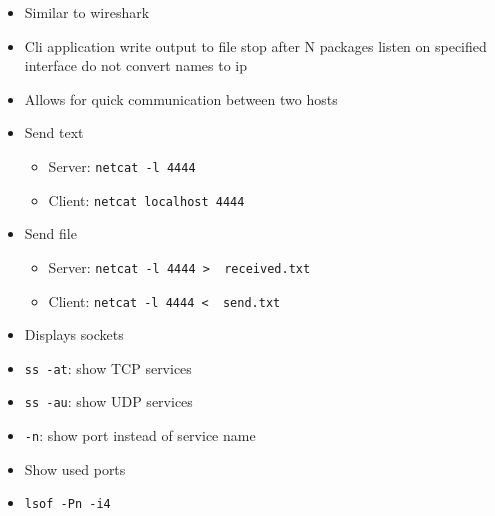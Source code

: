 \begin{itemize}
\begin{itemize}
            \item Similar to wireshark
            \item Cli application
             write output to file
             stop after N packages
             listen on specified interface
             do not convert names to ip
        \end{itemize}
        \begin{itemize}
            \item Allows for quick communication between two hosts
            \item Send text
                \begin{itemize}
                    \item Server: \verb+netcat -l 4444+
                    \item Client: \verb+netcat localhost 4444+
                \end{itemize}
            \item Send file
                \begin{itemize}
                    \item Server: \verb+netcat -l 4444 >  received.txt+
                    \item Client: \verb+netcat -l 4444 <  send.txt+
                \end{itemize}
        \end{itemize}
        \begin{itemize}
            \item Displays sockets
            \item \verb+ss -at+: show TCP services
            \item \verb+ss -au+: show UDP services
            \item \verb+-n+: show port instead of service name
        \end{itemize}
        \begin{itemize}
            \item Show used ports
            \item \verb+lsof -Pn -i4+
        \end{itemize}
\end{itemize}

